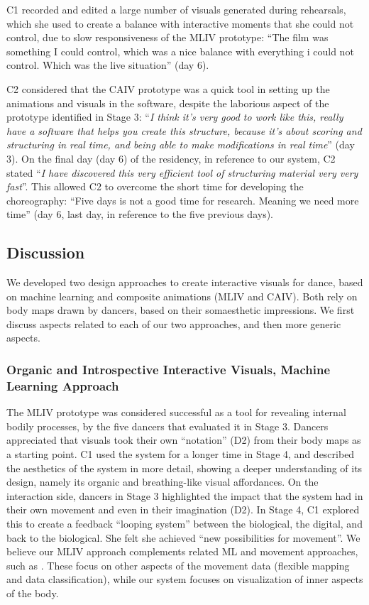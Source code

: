 C1 recorded and edited a large number of visuals generated during rehearsals, which she used to create a balance with interactive moments that she could not control, due to slow responsiveness of the MLIV prototype: “The film was something I could control, which was a nice balance with everything i could not control. Which was the live situation” (day 6).

C2 considered that the CAIV prototype was a quick tool in setting up the animations and visuals in the software, despite the laborious aspect of the prototype identified in Stage 3:
“\textit{I think it's very good to work like this, really have a software that helps you create this structure, because it's about scoring and structuring in real time, and being able to make modifications in real time}” (day 3). On the final day (day 6) of the residency, in reference to our system, C2 stated “\textit{I have discovered this very efficient tool of structuring material very very fast}”. This allowed C2 to overcome the short time for developing the choreography: “Five days is not a good time for research. Meaning we need more time” (day 6, last day, in reference to the five previous days).

\subsection{Discussion}

We developed two design approaches to create interactive visuals for dance, based on machine learning and composite animations (MLIV and CAIV). Both rely on body maps drawn by dancers, based on their somaesthetic impressions. We first discuss aspects related to each of our two approaches, and then more generic aspects.

\subsubsection{Organic and Introspective Interactive Visuals, Machine Learning Approach}

The MLIV prototype was considered successful as a tool for revealing internal bodily processes, by the five dancers that evaluated it in Stage 3. Dancers appreciated that visuals took their own “notation” (D2) from their body maps as a starting point. C1 used the system for a longer time in Stage 4, and described the aesthetics of the system in more detail, showing a deeper understanding of its design, namely its organic and breathing-like visual affordances. On the interaction side, dancers in Stage 3 highlighted the impact that the system had in their own movement and even in their imagination (D2). In Stage 4, C1 explored this to create a feedback “looping system” between the biological, the digital, and back to the biological. She felt she achieved “new possibilities for movement”. We believe our MLIV approach complements related ML and movement approaches, such as \cite{murray-browne_latent_2021,silang_maranan_designing_2014}. These focus on other aspects of the movement data (flexible mapping and data classification), while our system focuses on visualization of inner aspects of the body.

